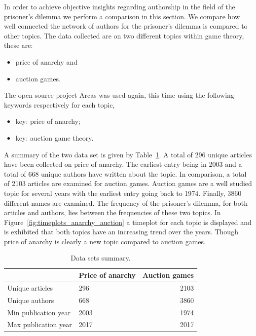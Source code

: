 \documentclass{article}
\begin{document}
In order to achieve objective insights regarding authorship in the field of the
prisoner's dilemma we perform a comparison in this section. We compare how well connected the
network of authors for the prisoner's dilemma is compared to other topics.
The data collected are on two different topics within game theory, these are:

\begin{itemize}
    \item price of anarchy and
    \item auction games.
\end{itemize}

The open source project Arcas was used again, this time using the following 
keywords respectively for each topic,

\begin{itemize}
    \item key: price of anarchy;
    \item key: auction game theory.
\end{itemize}

A summary of the two data set is given by Table~\ref{table:data_sets_summary}.
A total of 296 unique articles have been collected on price of anarchy. The 
earliest entry being in 2003 and a total of 668 unique authors have written about
the topic. In comparison, a total of 2103 articles are examined for auction 
games. Auction games are a well studied topic for several years with the earliest entry
going back to 1974. Finally, 3860 different names are examined. The frequency
of the prisoner's dilemma, for both articles and authors, lies between the frequencies
of these two topics. In Figure~\ref{fig:timeplots_anarchy_auction} a timeplot for each
topic is displayed and is exhibited that both topics have an increasing trend over
the years. Though price of anarchy is clearly a new topic compared to auction games.

\begin{table}[!hbtp]
    \begin{center}
    \begin{tabular}{llr}
        \toprule
         &            Price of anarchy &  Auction games \\
        \midrule
        Unique articles      & 296  & 2103 \\
        Unique authors       & 668  & 3860 \\
        Min publication year & 2003 & 1974 \\
        Max publication year & 2017 & 2017 \\
        \bottomrule
    \end{tabular}
    \end{center}
    \caption{Data sets summary.}\label{table:data_sets_summary}
\end{table}
\end{document}

